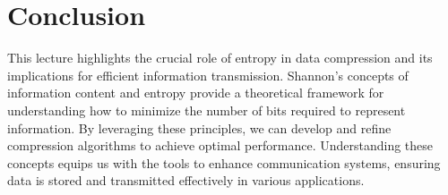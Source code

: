 \documentclass[12pt]{article}
\begin{document}
\section*{Conclusion}
This lecture highlights the crucial role of entropy in data compression and its implications for efficient information transmission. Shannon's concepts of information content and entropy provide a theoretical framework for understanding how to minimize the number of bits required to represent information. By leveraging these principles, we can develop and refine compression algorithms to achieve optimal performance. Understanding these concepts equips us with the tools to enhance communication systems, ensuring data is stored and transmitted effectively in various applications.



\end{document}
